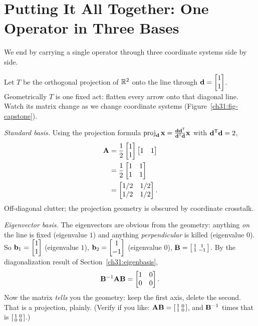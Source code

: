 \section{Putting It All Together: One Operator in Three Bases}
\label{ch31:capstone}

We end by carrying a single operator through three coordinate systems side by side.

\begin{example}
\label{ch31:ex-capstone}
Let $T$ be the orthogonal projection of $\mathbb{R}^2$ onto the line through
$\mathbf{d}=\begin{bmatrix}1\\1\end{bmatrix}$. Geometrically $T$ is one fixed act: flatten every arrow
onto that diagonal line. Watch its matrix change as we change coordinate systems
(Figure~\ref{ch31:fig-capstone}).

\emph{Standard basis.} Using the projection formula
$\operatorname{proj}_{\mathbf{d}}\mathbf{x}=\frac{\mathbf{d}\mathbf{d}^{\mathsf{T}}}{\mathbf{d}^{\mathsf{T}}\mathbf{d}}\mathbf{x}$ with
$\mathbf{d}^{\mathsf{T}}\mathbf{d}=2$,
\begin{align*}
  \mathbf{A} &= \frac12\begin{bmatrix}1\\1\end{bmatrix}\begin{bmatrix}1&1\end{bmatrix} \\
  &= \frac12\begin{bmatrix}1&1\\1&1\end{bmatrix} \\
  &= \begin{bmatrix}1/2&1/2\\1/2&1/2\end{bmatrix}.
\end{align*}
Off-diagonal clutter; the projection geometry is obscured by coordinate crosstalk.

\emph{Eigenvector basis.} The eigenvectors are obvious from the geometry: anything
\emph{on} the line is fixed (eigenvalue $1$) and anything \emph{perpendicular} is
killed (eigenvalue $0$). So $\mathbf{b}_1=\begin{bmatrix}1\\1\end{bmatrix}$ (eigenvalue $1$),
$\mathbf{b}_2=\begin{bmatrix}1\\-1\end{bmatrix}$ (eigenvalue $0$), $\mathbf{B}=\begin{bsmallmatrix}1&1\\1&-1\end{bsmallmatrix}$.
By the diagonalization result of Section~\ref{ch31:eigenbasis},
\[
  \mathbf{B}^{-1}\mathbf{A}\mathbf{B} = \begin{bmatrix}1&0\\0&0\end{bmatrix}.
\]
Now the matrix \emph{tells} you the geometry: keep the first axis, delete the
second. That is a projection, plainly. (Verify if you like: $\mathbf{A}\mathbf{B}
=\begin{bsmallmatrix}1&0\\1&0\end{bsmallmatrix}$, and $\mathbf{B}^{-1}$ times that is
$\begin{bsmallmatrix}1&0\\0&0\end{bsmallmatrix}$.)


\end{example}
